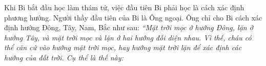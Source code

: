 \newpage
\graphicspath{{../timhieucungbi/hoclamthamtu/}}
\begingroup
{} %
\centering
\endgroup
\vspace*{4pt}
	Khi Bi bắt đầu học làm thám tử, việc đầu tiên Bi phải học là cách xác định phương hướng. Người thầy đầu tiên của Bi là Ông ngoại. Ông chỉ cho Bi cách xác định hướng Đông, Tây, Nam, Bắc như sau:
	\vskip 0.1cm
	\textit{“Mặt trời mọc ở hướng Đông, lặn ở hướng Tây, và mặt trời mọc và lặn ở hai hướng đối diện nhau. Vì thế, cháu có thể căn cứ vào hướng mặt trời mọc, hay hướng mặt trời lặn để xác định các hướng của đất trời. Cụ thể là thế này:}
